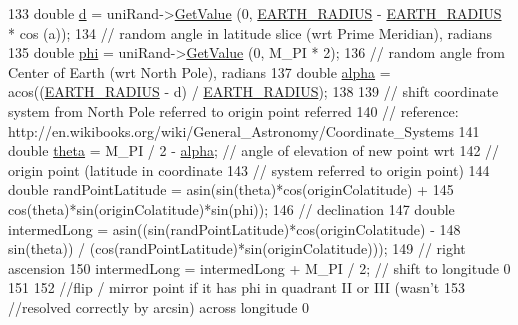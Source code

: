 \begin{DoxyCode}
133       \textcolor{keywordtype}{double} \hyperlink{buildings__pathloss_8m_a9f9b934daed17a4d3613b6886ff4cf4b}{d} = uniRand->\hyperlink{classns3_1_1UniformRandomVariable_a03822d8c86ac51e9aa83bbc73041386b}{GetValue} (0, \hyperlink{namespacens3_acd9e5214ec8a357ee2eb37cde6bd58f3}{EARTH\_RADIUS} - 
      \hyperlink{namespacens3_acd9e5214ec8a357ee2eb37cde6bd58f3}{EARTH\_RADIUS} * cos (a)); 
134       \textcolor{comment}{// random angle in latitude slice (wrt Prime Meridian), radians}
135       \textcolor{keywordtype}{double} \hyperlink{buildings__pathloss_8m_aaf40c223796354fb6b79c9ed047c513a}{phi} = uniRand->\hyperlink{classns3_1_1UniformRandomVariable_a03822d8c86ac51e9aa83bbc73041386b}{GetValue} (0, M\_PI * 2); 
136       \textcolor{comment}{// random angle from Center of Earth (wrt North Pole), radians}
137       \textcolor{keywordtype}{double} \hyperlink{lte__uplink__power__control_8m_a62197192f0fbf4e0675eb37be1c4c175}{alpha} = acos((\hyperlink{namespacens3_acd9e5214ec8a357ee2eb37cde6bd58f3}{EARTH\_RADIUS} - d) / \hyperlink{namespacens3_acd9e5214ec8a357ee2eb37cde6bd58f3}{EARTH\_RADIUS}); 
138 
139       \textcolor{comment}{// shift coordinate system from North Pole referred to origin point referred}
140       \textcolor{comment}{// reference: http://en.wikibooks.org/wiki/General\_Astronomy/Coordinate\_Systems}
141       \textcolor{keywordtype}{double} \hyperlink{loss__ITU1411__NLOS__over__rooftop_8m_a68ce9834ce390774bce9c89b78d5bf79}{theta} = M\_PI / 2 - \hyperlink{lte__uplink__power__control_8m_a62197192f0fbf4e0675eb37be1c4c175}{alpha}; \textcolor{comment}{// angle of elevation of new point wrt }
142                                        \textcolor{comment}{// origin point (latitude in coordinate }
143                                        \textcolor{comment}{// system referred to origin point)}
144       \textcolor{keywordtype}{double} randPointLatitude = asin(sin(theta)*cos(originColatitude) + 
145                                  cos(theta)*sin(originColatitude)*sin(phi)); 
146                                  \textcolor{comment}{// declination}
147       \textcolor{keywordtype}{double} intermedLong = asin((sin(randPointLatitude)*cos(originColatitude) - 
148                             sin(theta)) / (cos(randPointLatitude)*sin(originColatitude))); 
149                             \textcolor{comment}{// right ascension}
150       intermedLong = intermedLong + M\_PI / 2; \textcolor{comment}{// shift to longitude 0}
151 
152       \textcolor{comment}{//flip / mirror point if it has phi in quadrant II or III (wasn't }
153       \textcolor{comment}{//resolved correctly by arcsin) across longitude 0}

\end{DoxyCode}
